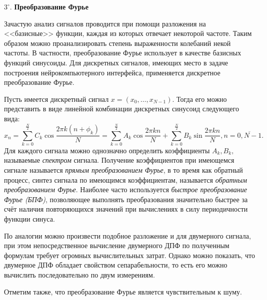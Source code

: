 \documentclass[12pt,fleqn]{article}
\begin{document}
	\par $3^{\circ}.$ {\bf Преобразование Фурье}
	\par Зачастую анализ сигналов проводится при помощи разложения на <<базисные>> функции, каждая из которых отвечает некоторой частоте. Таким образом можно проанализировать степень выраженности колебаний некой частоты. В частности, преобразование Фурье использует в качестве базисных функций синусоиды. Для дискретных сигналов, имеющих место в задаче построения нейрокомпьютерного интерфейса, применяется дискретное преобразование Фурье.
	\par Пусть имеется дискретный сигнал $x = (x_0, \dots, x_{N-1})$. Тогда его можно представить в виде линейной комбинации дискретных синусоид следующего вида:
$$x_n = \sum_{k=0}^{\frac{N}{2}} C_k \cos{\frac{2 \pi k (n + \phi_k)}{N}} = \sum_{k=0}^{\frac{N}{2}} A_k \cos{\frac{2 \pi k n}{N}} + \sum_{k=0}^{\frac{N}{2}} B_k \sin{\frac{2 \pi k n}{N}}, n = \overline{0, N-1}.$$
	Для каждого сигнала можно однозначно определить коэффициенты $A_k, B_k,$ называемые {\it спектром} сигнала. Получение коэффициентов при имеющемся сигнале называется {\it прямым преобразованием Фурье}, в то время как обратный процесс, синтез сигнала по имеющимся коэффициентам, называется {\it обратным преобразованием Фурье}. Наиболее часто используется {\it быстрое преобразование Фурье (БПФ)}, позволяющее выполнять преобразования значительно быстрее за счёт  наличия повторяющихся значений при вычислениях в силу периодичности функции синуса. 
	\par По аналогии можно произвести подобное разложение и для двумерного сигнала, при этом непосредственное вычисление двумерного ДПФ по полученным формулам требует огромных вычислительных затрат. Однако можно показать, что двумерное ДПФ обладает свойством сепарабельности, то есть его можно вычислить последовательно по двум измерениям. 
	\par Отметим также, что преобразование Фурье является чувствительным к шуму.
\end{document}
